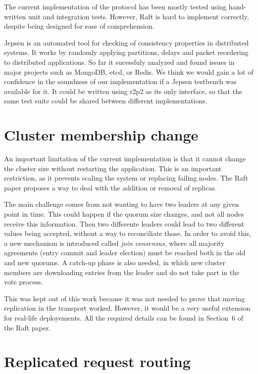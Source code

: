 The current implementation of the protocol has been mostly tested using hand-written unit and integration tests.
However, Raft is hard to implement correctly, despite being designed for ease of comprehension.


Jepsen\cite{jepsen} is an automated tool for checking of consistency properties in distributed systems.
It works by randomly applying partitions, delays and packet reordering to distributed applications.
So far it sucessfuly analyzed and found issues in major projects such as MongoDB, etcd, or Redis.
We think we would gain a lot of confidence in the soundness of our implementation if a Jepsen testbench was available for it.
It could be written using \gls{r2p2} as its only interface, so that the same test suite could be shared between different implementations.

\section{Cluster membership change}

An important limitation of the current implementation is that it cannot change the cluster size without restarting the application.
This is an important restriction, as it prevents scaling the system or replacing failing nodes.
The Raft paper\cite{raft} proposes a way to deal with the addition or removal of replicas.

The main challenge comes from not wanting to have two leaders at any given point in time.
This could happen if the quorum size changes, and not all nodes receive this information.
Then two differente leaders could lead to two different values being accepted, without a way to reconciliate those.
In order to avoid this, a new mechanism is introduced called \emph{join consensus}, where all majority agreements (entry commit and leader election) must be reached both in the old and new quorums.
A catch-up phase is also needed, in which new cluster members are downloading entries from the leader and do not take part in the vote process.

This was kept out of this work because it was not needed to prove that moving replication in the transport worked.
However, it would be a very useful extension for real-life deployements.
All the required details can be found in Section~6 of the Raft paper\cite[p.~10]{raft}.


\section{Replicated request routing}

